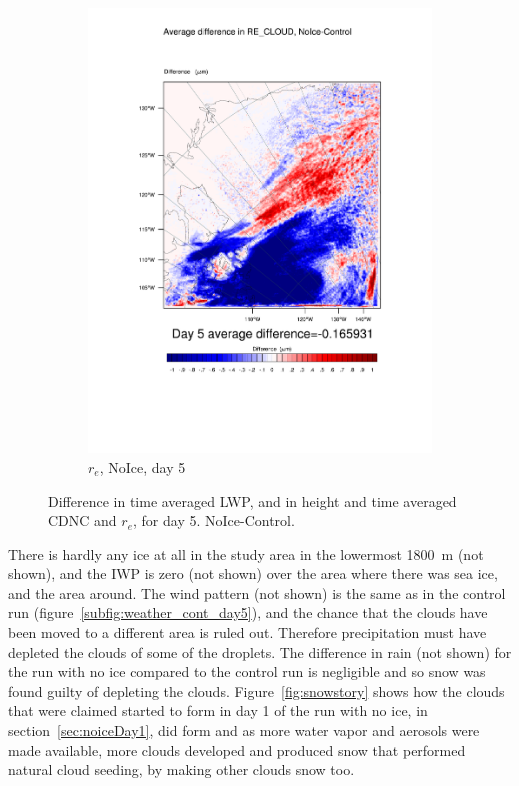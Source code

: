 \begin{figure}[hb]
	\begin{subfigure}{0.48\textwidth}
		\centering
		\includegraphics[width=\textwidth]{results/noice/diff_NoIce_RE_CLOUD_Day5.pdf}
		\caption{$r_e$, NoIce, day 5}
		\label{subfig:recloud_r2Day5}
	\end{subfigure}
\caption{Difference in time averaged LWP, and in height and time averaged CDNC and $r_e$, for day 5. NoIce-Control.}
\label{fig:lwpcdncre_r2Day5}
\end{figure}

There is hardly any ice at all in the study area in the lowermost 1800~m (not shown), and the IWP is zero (not shown) over the area where there was sea ice, and the area around. The wind pattern (not shown) is the same as in the control run (figure~\ref{subfig:weather_cont_day5}), and the chance that the clouds have been moved to a different area is ruled out. Therefore precipitation must have depleted the clouds of some of the droplets. The difference in rain (not shown) for the run with no ice compared to the control run is negligible and so snow was found guilty of depleting the clouds. Figure~\ref{fig:snowstory} shows how the clouds that were claimed started to form in day 1 of the run with no ice, in section~\ref{sec:noiceDay1}, did form and as more water vapor and aerosols were made available, more clouds developed and produced snow that performed natural cloud seeding, by making other clouds snow too.

